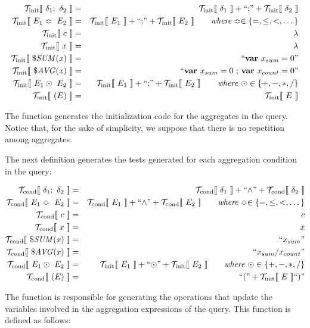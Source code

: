 \begin{eqnarray*}
\tqI{\delta_1 ; \ \delta_2}	& = & \tqI{\delta_1} + \hbox{``;''} + \tqI{\delta_2} \\
\tqI{E_1 \Bumpeq \ E_2} 		& = & \tqI{E_1} + \hbox{``;''} + \tqI{E_2}
									\qquad \mathit{where} \Bumpeq \in \{ =, \leq, <, \dots \}\\
\tqI{c} 						& = & \lambda \\
\tqI{x} 						& = & \lambda \\
\tqI{\$\mathit{SUM(x)}}	 	& = & \hbox{``\textbf{var} $x_{sum} = 0$''} \\
\tqI{\$\mathit{AVG(x)}}	 	& = & \hbox{``\textbf{var} $x_{sum} = 0$ ; \textbf{var} $x_{count} = 0$''} \\
\tqI{E_1 \odot \ E_2} 		& = & \tqI{E_1} + \hbox{``;''} + \tqI{E_2} 
									\qquad \mathit{where}\ \odot \in \{ +, -, *, / \}\\
\tqI{( E )} 					& = & \tqI{E} 
\end{eqnarray*}

The function \tqI{\_} generates the initialization code for the aggregates in the query. 
Notice that, for the sake of simplicity, we suppose that there is no repetition among aggregates.

The next definition generates the tests generated for each aggregation condition in the query:

\begin{eqnarray*}
\tqT{\delta_1 ; \ \delta_2} 	& = & \tqT{\delta_1} + \hbox{``$\wedge$''} + \tqT{\delta_2} \\
\tqT{E_1 \Bumpeq \ E_2} 		& = & \tqT{E_1} + \hbox{``$\wedge$''} + \tqT{E_2}
									\qquad \mathit{where} \Bumpeq \in \{ =, \leq, <, \dots \}\\
\tqT{c} 						& = & c \\
\tqT{x} 						& = & x \\
\tqT{\$\mathit{SUM(x)}} 		& = & \hbox{``$x_{sum}$''} \\
\tqT{\$\mathit{AVG(x)}} 		& = & \hbox{``$x_{sum} / x_{count}$''} \\
\tqT{E_1 \odot \ E_2}		& = & \tqI{E_1} + \hbox{``$\odot$''} + \tqI{E_2} 
									\qquad \mathit{where}\ \odot \in \{ +, -, *, / \}\\
\tqT{( E )} 					& = & \hbox{``(''} + \tqI{E} \hbox{``)''}
\end{eqnarray*}

The function \tqS{\_} is responsible for generating the operations that update the variables involved in the aggregation expressions of the query.
This function is defined as follows:

